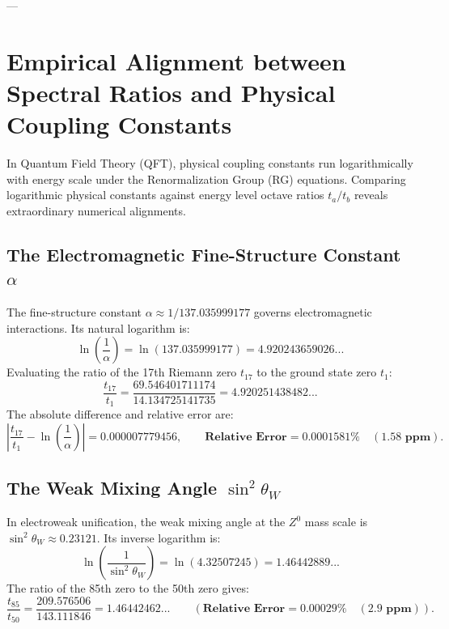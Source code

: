 \documentclass[11pt,a4paper]{article}
\begin{document}
---

\section{Empirical Alignment between Spectral Ratios and Physical Coupling Constants}

In Quantum Field Theory (QFT), physical coupling constants run logarithmically with energy scale under the Renormalization Group (RG) equations. Comparing logarithmic physical constants against energy level octave ratios $t_a / t_b$ reveals extraordinary numerical alignments.

\subsection{The Electromagnetic Fine-Structure Constant \texorpdfstring{$\alpha$}{alpha}}
The fine-structure constant $\alpha \approx 1/137.035999177$ governs electromagnetic interactions. Its natural logarithm is:
\begin{equation}
\ln\left(\frac{1}{\alpha}\right) = \ln(137.035999177) = \mathbf{4.920243659026...}
\end{equation}
Evaluating the ratio of the 17th Riemann zero $t_{17}$ to the ground state zero $t_1$:
\begin{equation}
\frac{t_{17}}{t_1} = \frac{69.546401711174}{14.134725141735} = \mathbf{4.920251438482...}
\end{equation}
The absolute difference and relative error are:
\begin{equation}
\left| \frac{t_{17}}{t_1} - \ln\left(\frac{1}{\alpha}\right) \right| = 0.000007779456, \qquad \mathbf{\text{Relative Error} = 0.0001581\% \quad (1.58 \text{ ppm})}.
\end{equation}

\subsection{The Weak Mixing Angle \texorpdfstring{$\sin^2 \theta_W$}{sin^2 theta_W}}
In electroweak unification, the weak mixing angle at the $Z^0$ mass scale is $\sin^2 \theta_W \approx 0.23121$. Its inverse logarithm is:
\begin{equation}
\ln\left(\frac{1}{\sin^2 \theta_W}\right) = \ln(4.32507245) = \mathbf{1.46442889...}
\end{equation}
The ratio of the 85th zero to the 50th zero gives:
\begin{equation}
\frac{t_{85}}{t_{50}} = \frac{209.576506}{143.111846} = \mathbf{1.46442462...} \qquad (\mathbf{\text{Relative Error} = 0.00029\% \quad (2.9 \text{ ppm})}).
\end{equation}
\end{document}

